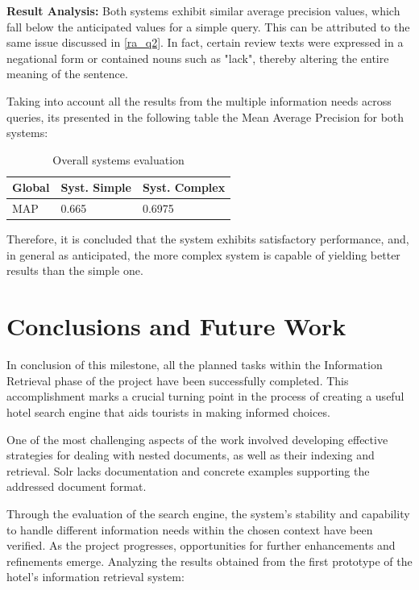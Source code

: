 \documentclass[sigconf]{acmart}
\begin{document}
\textbf{Result Analysis:} Both systems exhibit similar average precision values, which fall below the anticipated values for a simple query. This can be attributed to the same issue discussed in \ref{ra_q2}. In fact, certain review texts were expressed in a negational form or contained nouns such as "lack", thereby altering the entire meaning of the sentence.


Taking into account all the results from the multiple information needs across queries, its presented in the following table the Mean Average Precision for both systems:

\begin{table}[h]
\caption{Overall systems evaluation}
\label{tab:systems_ev}
\begin{tabular}{lll}
\toprule
Global & Syst. Simple & Syst. Complex\\
\midrule
MAP & 0.665 & 0.6975  \\

\bottomrule
\end{tabular}
\end{table}

Therefore, it is concluded that the system exhibits satisfactory performance, and, in general as anticipated, the more complex system is capable of yielding better results than the simple one.

\renewcommand{\thesubsection}{\arabic{section}.\arabic{subsection}}
\section{Conclusions and Future Work} \label{sec:future_work}

In conclusion of this milestone, all the planned tasks within the Information Retrieval phase of the project have been successfully completed. This accomplishment marks a crucial turning point in the process of creating a useful hotel search engine that aids tourists in making informed choices.

One of the most challenging aspects of the work involved developing effective strategies for dealing with nested documents, as well as their indexing and retrieval. Solr lacks documentation and concrete examples supporting the addressed document format.

Through the evaluation of the search engine, the system's stability and capability to handle different information needs within the chosen context have been verified. As the project progresses, opportunities for further enhancements and refinements emerge. Analyzing the results obtained from the first prototype of the hotel's information retrieval system:
\end{document}
